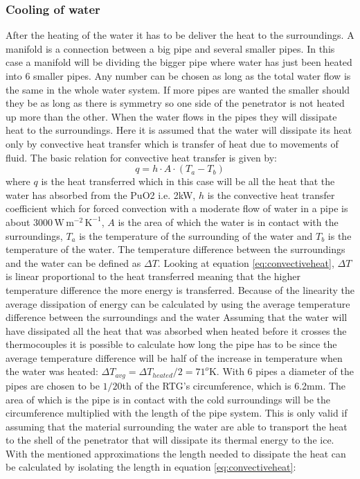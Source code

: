 \subsubsection{Cooling of water}
After the heating of the water it has to be deliver the heat to the surroundings. A manifold is a connection between a big pipe and several smaller pipes. In this case a manifold will be dividing the bigger pipe where water has just been heated into 6 smaller pipes. Any number can be chosen as long as the total water flow is the same in the whole water system. If more pipes are wanted the smaller should they be as long as there is symmetry so one side of the penetrator is not heated up more than the other. When the water flows in the pipes they will dissipate heat to the surroundings. Here it is assumed that the water will dissipate its heat only by convective heat transfer which is transfer of heat due to movements of fluid. The basic relation for convective heat transfer is given by:
\begin{equation}\label{eq:convectiveheat}
q = h \cdot A \cdot (T_a - T_b)
\end{equation}
where $q$ is the heat transferred which in this case will be all the heat that the water has absorbed from the PuO2 i.e. 2kW, $h$ is the convective heat transfer coefficient which for forced convection with a moderate flow of water in a pipe is about $3000 \, \mathrm{W \, m^{-2} \, K^{-1}}$\cite{website:waterconvection}, $A$ is the area of which the water is in contact with the surroundings, $T_a$ is the temperature of the surrounding of the water and $T_b$ is the temperature of the water. The temperature difference between the surroundings and the water can be defined as $\Delta T$. Looking at equation \ref{eq:convectiveheat}, $\Delta T$ is linear proportional to the heat transferred meaning that the higher temperature difference the more energy is transferred. Because of the linearity the average dissipation of energy can be calculated by using the average temperature difference between the surroundings and the water Assuming that the water will have dissipated all the heat that was absorbed when heated before it crosses the thermocouples it is possible to calculate how long the pipe has to be since the average temperature difference will be half of the increase in temperature when the water was heated: $\Delta T_{avg} = \Delta T_{heated} / 2 = 71^o$K. With 6 pipes a diameter of the pipes are chosen to be $1/20$th of the RTG's circumference, which is 6.2mm.
The area of which is the pipe is in contact with the cold surroundings will be the circumference multiplied with the length of the pipe system. This is only valid if assuming that the material surrounding the water are able to transport the heat to the shell of the penetrator that will dissipate its thermal energy to the ice. With the mentioned approximations the length needed to dissipate the heat can be calculated by isolating the length in equation \ref{eq:convectiveheat}:
